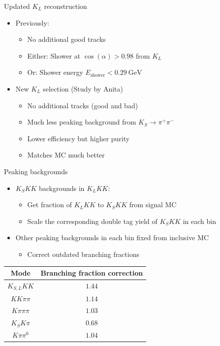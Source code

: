 \documentclass{beamer}
\begin{document}
\begin{frame}{Updated $K_L$ reconstruction}
  \begin{itemize}
    \setlength\itemsep{2em}
    \item{Previously:}
    \begin{itemize}
      \item{No additional good tracks}
      \item{Either: Shower at $\cos(\alpha) > 0.98$ from $K_L$}
      \item{Or: Shower energy $E_\text{shower} < \SI{0.29}{\giga\eV}$}
    \end{itemize}
    \item{New $K_L$ selection (Study by Anita)}
    \begin{itemize}
      \item{No additional tracks (good and bad)}
      \item{Much less peaking background from $K_S\to\pi^+\pi^-$}
      \item{Lower efficiency but higher purity}
      \item{Matches MC much better}
    \end{itemize}
  \end{itemize}
\end{frame}

\begin{frame}{Peaking backgrounds}
  \begin{itemize}
    \item{$K_SKK$ backgrounds in $K_LKK$:}
    \begin{itemize}
      \item{Get fraction of $K_LKK$ to $K_SKK$ from signal MC}
      \item{Scale the corresponding double tag yield of $K_SKK$ in each bin}
    \end{itemize}
  \end{itemize}
  \begin{itemize}
    \item{Other peaking backgrounds in each bin fixed from inclusive MC}
    \begin{itemize}
      \item{Correct outdated branching fractions}
    \end{itemize}
  \end{itemize}
  \vspace{0.5cm}
  \centering
  \def\arraystretch{1.2}%
  \begin{tabular}{c|c}
    Mode          & Branching fraction correction \\
    \hline
    $K_{S, L}KK$  & $1.44$ \\
    $KK\pi\pi$    & $1.14$ \\
    $K\pi\pi\pi$  & $1.03$ \\
    $K_SK\pi$     & $0.68$ \\
    $K\pi\pi^0$   & $1.04$ \\
    \hline
  \end{tabular}
\end{frame}
\end{document}
